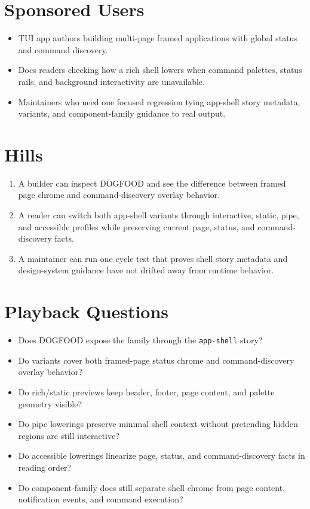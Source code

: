 \section{Sponsored Users}\label{record-104-sponsored-users}

\begin{itemize}
\tightlist
\item
  TUI app authors building multi-page framed applications with global status and command discovery.
\item
  Docs readers checking how a rich shell lowers when command palettes, status rails, and background interactivity are unavailable.
\item
  Maintainers who need one focused regression tying app-shell story metadata, variants, and component-family guidance to real output.
\end{itemize}

\section{Hills}\label{record-104-hills}

\begin{enumerate}
\def\labelenumi{\arabic{enumi}.}
\tightlist
\item
  A builder can inspect DOGFOOD and see the difference between framed page chrome and command-discovery overlay behavior.
\item
  A reader can switch both app-shell variants through interactive, static, pipe, and accessible profiles while preserving current page, status, and command-discovery facts.
\item
  A maintainer can run one cycle test that proves shell story metadata and design-system guidance have not drifted away from runtime behavior.
\end{enumerate}

\section{Playback Questions}\label{record-104-playback-questions}

\begin{itemize}
\tightlist
\item
  Does DOGFOOD expose the family through the \texttt{a\allowbreak{}p\allowbreak{}p\allowbreak{}-\allowbreak{}s\allowbreak{}h\allowbreak{}e\allowbreak{}l\allowbreak{}l} story?
\item
  Do variants cover both framed-page status chrome and command-discovery overlay behavior?
\item
  Do rich/static previews keep header, footer, page content, and palette geometry visible?
\item
  Do pipe lowerings preserve minimal shell context without pretending hidden regions are still interactive?
\item
  Do accessible lowerings linearize page, status, and command-discovery facts in reading order?
\item
  Do component-family docs still separate shell chrome from page content, notification events, and command execution?
\end{itemize}

